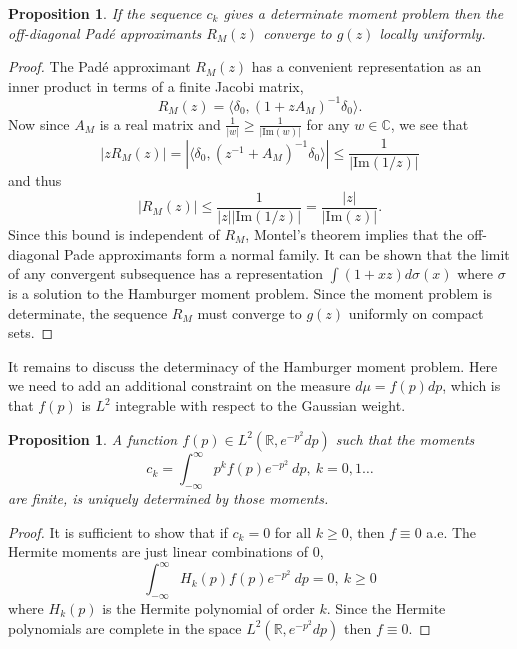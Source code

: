 \documentclass{amsart}
\newtheorem{proposition}[theorem]{Proposition}
\theoremstyle{remark}
\numberwithin{equation}{section}
\newcommand{\CC}{\mathbb{C}}
\begin{document}
\begin{proposition}
    If the sequence $c_k$ gives a determinate moment problem then the off-diagonal Pad\'e approximants $R_M(z)$ converge to $g(z)$ locally uniformly.
\end{proposition}

\begin{proof}
    The Pad\'e approximant $R_M(z)$ has a convenient representation as an inner product in terms of a finite Jacobi matrix,
    \[
        R_M(z) = \langle \delta_0, {(1 + zA_M)}^{-1} \delta_0 \rangle.
    \]
    Now since $A_M$ is a real matrix and $\frac1{|w|} \geq \frac1{|\text{Im}(w)|}$ for any $w \in \CC$, we see that
    \[
        |zR_M(z)| = |\langle \delta_0, {(z^{-1} + A_M)}^{-1} \delta_0 \rangle| \leq \frac1{|\text{Im}(1/z)|}
    \]
    and thus
    \[
        |R_M(z)| \leq \frac1{|z||\text{Im}(1/z)|} = \frac{|z|}{|\text{Im}(z)|}.
    \]
    Since this bound is independent of $R_M$, Montel's theorem implies that the off-diagonal Pade approximants form a normal family. It can be shown that the limit of any convergent subsequence has a representation $\int (1+ xz)d\sigma(x)$ where $\sigma$ is a solution to the Hamburger moment problem. Since the moment problem is determinate, the sequence $R_M$ must converge to $g(z)$ uniformly on compact sets.
\end{proof}

It remains to discuss the determinacy of the Hamburger moment problem. Here we need to add an additional constraint on the measure $d\mu = f(p)dp$, which is that $f(p)$ is $L^2$ integrable with respect to the Gaussian weight.

\begin{proposition}
    A function $f(p) \in L^2(\mathbb{R}, e^{-p^2}dp)$ such that the moments 
    \begin{equation}
        \label{eq:3}
        c_k = \int_{-\infty}^\infty p^k f(p) e^{-p^2} ~dp, ~ k = 0, 1 \ldots
    \end{equation}
    are finite, is uniquely determined by those moments.
\end{proposition}
    
\begin{proof}
    It is sufficient to show that if $c_k = 0$ for all $k \geq 0$, then $f \equiv 0$ a.e. The Hermite moments are just linear combinations of $0$,
    \[
        \int_{-\infty}^\infty H_k(p) f(p) e^{-p^2} ~dp = 0, ~ k \geq 0
    \]
    where $H_k(p)$ is the Hermite polynomial of order $k$. Since the Hermite polynomials are complete in the space $L^2(\mathbb{R}, e^{-p^2}dp)$ then $f \equiv 0$.
\end{proof}
\end{document}
